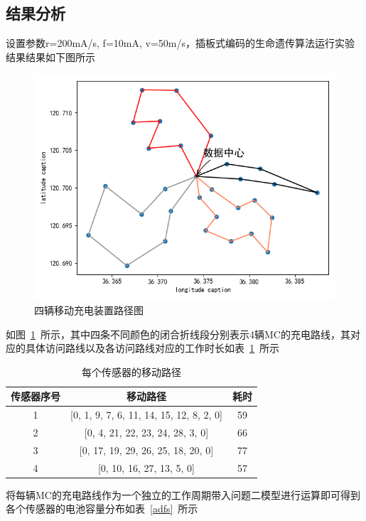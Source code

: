 \documentclass{whutmod}
\begin{document}
  		\subsection{结果分析}
  	设置参数r=200mA/s, f=10mA, v=50m/s，插板式编码的生命遗传算法运行实验结果结果如下图所示  	
  \begin{figure}[H]
  	\centering
  	\includegraphics[width=.8\textwidth]{figures/s3.png}
  	\caption{四辆移动充电装置路径图}\label{gdfsdf}
  \end{figure}
  如图~\ref{gdfsdf}~所示，其中四条不同颜色的闭合折线段分别表示4辆MC的充电路线，其对应的具体访问路线以及各访问路线对应的工作时长如表~\ref{bidsao2}~所示
  		\begin{table}[H]
	\centering		
	\caption{每个传感器的移动路径}\label{bidsao2}
	\begin{tabular}{ccc}
		\toprule[2pt]
		\multicolumn{1}{m{2.5cm}}{\centering 传感器序号}
		& \multicolumn{1}{m{4.5cm}}{\centering 移动路径}& \multicolumn{1}{m{2.5cm}}{\centering 耗时}
		\\
		\midrule[1pt]
		1 &   [0, 1, 9, 7, 6, 11, 14, 15, 12, 8, 2, 0]& 59\\ 
		2&  [0, 4, 21, 22, 23, 24, 28, 3, 0]
		&66\\ 
		3&   [0, 17, 19, 29, 26, 25, 18, 20, 0]& 77 \\ 
		4& [0, 10, 16, 27, 13, 5, 0]& 57 \\ 
		\bottomrule[2pt]	
	\end{tabular}
\end{table}
将每辆MC的充电路线作为一个独立的工作周期带入问题二模型进行运算即可得到各个传感器的电池容量分布如表~\ref{adfs}~所示
\end{document}
